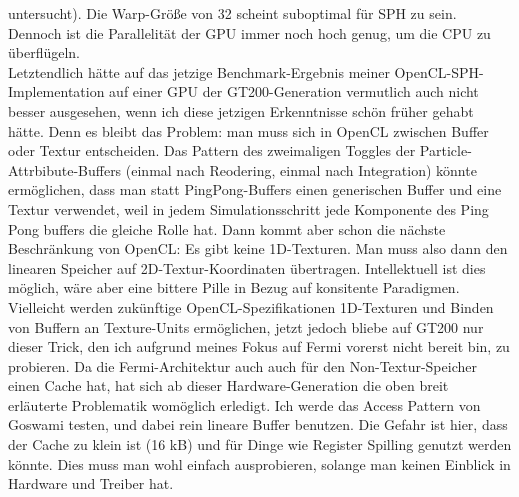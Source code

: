 \begin{enumerate}
		untersucht).
		Die Warp-Größe von 32 scheint suboptimal für SPH zu sein. Dennoch ist die Parallelität der GPU
		immer noch hoch genug, um die CPU zu überflügeln.\\
		Letztendlich hätte auf das jetzige Benchmark-Ergebnis meiner OpenCL-SPH-Implementation
		auf einer GPU der GT200-Generation vermutlich auch nicht besser ausgesehen, wenn ich diese 
		jetzigen Erkenntnisse schön früher gehabt hätte. Denn es bleibt das Problem: man muss sich in
		OpenCL zwischen Buffer oder Textur entscheiden.
		 Das Pattern des zweimaligen Toggles der Particle-Attrbibute-Buffers
		(einmal nach Reodering, einmal nach Integration) könnte ermöglichen, dass man statt PingPong-Buffers
		einen generischen Buffer und eine Textur verwendet, weil in jedem Simulationsschritt jede Komponente
		des Ping Pong buffers die gleiche Rolle hat. Dann kommt aber schon die nächste Beschränkung von
		OpenCL: Es gibt keine 1D-Texturen. Man muss also dann den linearen Speicher auf 2D-Textur-Koordinaten
		übertragen. Intellektuell ist dies möglich, wäre aber eine bittere Pille in Bezug auf konsitente Paradigmen.
		Vielleicht werden zukünftige OpenCL-Spezifikationen 1D-Texturen und Binden von Buffern an Texture-Units
		ermöglichen, jetzt jedoch bliebe auf GT200 nur dieser Trick, den ich aufgrund meines Fokus auf Fermi vorerst 
		nicht bereit bin, zu probieren.
		Da die Fermi-Architektur auch auch für den Non-Textur-Speicher einen Cache hat, hat sich ab dieser
		Hardware-Generation die 
		oben breit erläuterte Problematik womöglich erledigt. Ich werde das Access Pattern von Goswami
		testen, und dabei  rein lineare Buffer benutzen. Die Gefahr ist hier, dass der Cache zu klein ist
		(16 kB) und für Dinge wie Register Spilling genutzt werden könnte. Dies muss man wohl einfach ausprobieren,
		solange man keinen Einblick in Hardware und Treiber hat.
		
	\end{enumerate}	
	

